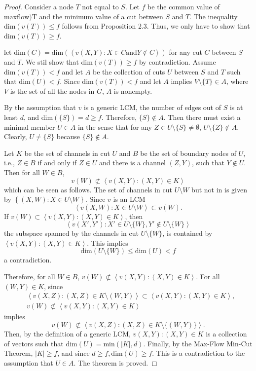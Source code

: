 \documentclass{IEEEtran}
\newtheorem{proof}{\hskip 2em Proof}
\begin{document}
\begin{proof}
	Consider a node $T$ not equal to $S$. Let $f$ be the common value of $\text{maxflow){T}}$ and the minimum value of a cut between $S$ and $T$. The inequality $\text{dim}(v(T))\leq f$ follows from Proposition 2.3. Thus, we only have to show that $\text{dim}(v(T))\geq f$.
	\par let $\text{dim}(C)=\text{dim}(\left \langle v(X,Y):X\in C \text{and} Y\notin C\right \rangle)$ for any cut $C$ between $S$ and $T$. We stil show that $\text{dim}(v(T)) \geq f$ by contradiction. Assume $\text{dim}(v(T)) < f$ and let $A$ be the collection of cuts $U$ between $S$ and $T$ such that $\text{dim}(U)<f$. Since $\text{dim}(v(T)) < f$ and let $A$ implies $V\setminus \{T\}\in A$, where $V$ is the set of all the nodes in $G$, $A$ is nonempty.
	\par By the assumption that $v$ is a generic LCM, the number of edges out of $S$ is at least $d$, and $\text{dim}(\{S\})=d\geq f$. Therefore, $\{S\}\notin A$. Then there must exist a minimal member $U\in A$ in the sense that for any $Z\in U\setminus \{S\} \neq \emptyset$, $U\setminus \{Z\} \notin A$. Clearly, $U\neq \{S\}$ because $\{S\}\notin A$.
	\par Let $K$ be the set of channels in cut $U$ and $B$ be the set of boundary nodes of $U$, i.e., $Z\in B$ if and only if $Z\in U$ and there 	is a channel $(Z,Y)$, such that $Y\notin U$. Then for all $W\in B$,
	$$v(W)\nsubset \left \langle v(X,Y):(X,Y)\in K \right \rangle$$
	which can be seen as follows. The set of channels in cut $U\setminus {W}$ but not in is given by $\left \{ (X,W):X\in U\setminus{W}\right \}$. Since $v$ is an LCM
	$$\left \langle v(X,W): X\in U\setminus {W}\right \rangle \subset v(W).$$
	If $v(W)\subset \left \langle v(X,Y):(X,Y)\in K\right \rangle$, then
	$$\left \langle v(X',Y'):X'\in U\setminus \{W\},Y'\notin U\setminus \{W\}\right \rangle$$
	the subspace spanned by the channels in cut $U\setminus \{W\}$, is contained by $\left \langle v(X,Y):(X,Y)\in K\right \rangle$. This implies
	$$\text{dim}(U\setminus \{W\})\leq\text{dim}(U)<f$$
	a contradiction.
	\par Therefore, for all $W\in B$, $v(W)\nsubset \left \langle v(X,Y):(X,Y)\in K\right \rangle$. For all $(W,Y)\in K$, since
	\begin{align*}
	&\left \langle v(X,Z):(X,Z)\in K\setminus {(W,Y)}\right \rangle \subset \left \langle v(X,Y):(X,Y)\in K\right \rangle, \\
	&v(W)\nsubset \left \langle v(X,Y):(X,Y)\in K\right \rangle
	\end{align*}
	implies
	$$v(W)\nsubset \left \langle v(X,Z):(X,Z)\in K \setminus\{(W,Y)\}\right \rangle.$$
	Then, by the definition of a generic LCM, ${v(X,Y):(X,Y)\in K}$ is a collection of vectors such that $\text{dim}(U)=\text{min}(|K|,d)$. Finally, by the Max-Flow Min-Cut Theorem, $|K|\geq f$, and since $d\geq f,\text{dim}(U)\geq f$. This is a contradiction to the assumption that $U\in A$. The theorem is proved.
\end{proof}
\end{document}
